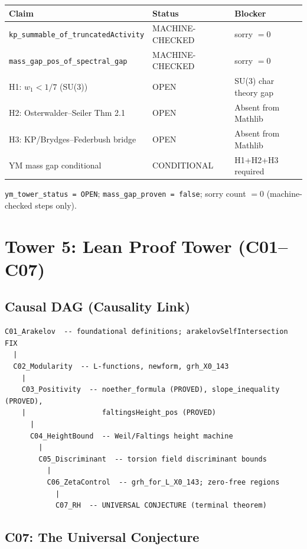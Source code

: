 \documentclass[12pt,letterpaper]{article}
\begin{document}
\begin{center}
\begin{tabular}{lll}
\toprule
Claim & Status & Blocker \\
\midrule
\texttt{kp\_summable\_of\_truncatedActivity} & MACHINE-CHECKED & sorry $= 0$ \\
\texttt{mass\_gap\_pos\_of\_spectral\_gap} & MACHINE-CHECKED & sorry $= 0$ \\
H1: $w_1 < 1/7$ (SU(3)) & OPEN & SU(3) char theory gap \\
H2: Osterwalder--Seiler Thm 2.1 & OPEN & Absent from Mathlib \\
H3: KP/Brydges--Federbush bridge & OPEN & Absent from Mathlib \\
YM mass gap conditional & CONDITIONAL & H1+H2+H3 required \\
\bottomrule
\end{tabular}
\end{center}

\texttt{ym\_tower\_status = OPEN};
\texttt{mass\_gap\_proven = false};
sorry count $= 0$ (machine-checked steps only).

\newpage
\section{Tower 5: Lean Proof Tower (C01--C07)}

\subsection{Causal DAG (Causality Link)}

\begin{verbatim}
C01_Arakelov  -- foundational definitions; arakelovSelfIntersection FIX
  |
  C02_Modularity  -- L-functions, newform, grh_X0_143
    |
    C03_Positivity  -- noether_formula (PROVED), slope_inequality (PROVED),
    |                  faltingsHeight_pos (PROVED)
      |
      C04_HeightBound  -- Weil/Faltings height machine
        |
        C05_Discriminant  -- torsion field discriminant bounds
          |
          C06_ZetaControl  -- grh_for_L_X0_143; zero-free regions
            |
            C07_RH  -- UNIVERSAL CONJECTURE (terminal theorem)
\end{verbatim}

\subsection{C07: The Universal Conjecture}
\end{document}
